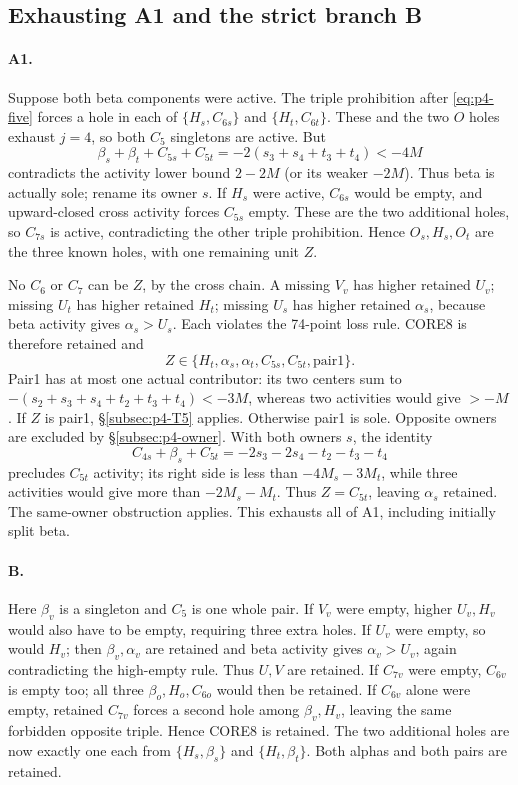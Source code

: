 \documentclass[11pt,letterpaper]{article}
\theoremstyle{definition}\newtheorem{definition}[theorem]{Definition}
\begin{document}
\subsection{Exhausting A1 and the strict branch B}\label{subsec:p4-A1B}
\paragraph{A1.}
Suppose both beta components were active. The triple prohibition after
\eqref{eq:p4-five} forces a hole in each of
$\{H_s,C_{6s}\}$ and $\{H_t,C_{6t}\}$.
These and the two $O$ holes exhaust $j=4$, so both $C_5$ singletons are
active. But
\[
 \beta_s+\beta_t+C_{5s}+C_{5t}
 =-2(s_3+s_4+t_3+t_4)<-4M
\]
contradicts the activity lower bound $2-2M$ (or its weaker $-2M$).
Thus beta is actually sole; rename its owner $s$.
If $H_s$ were active, $C_{6s}$ would be empty, and upward-closed cross
activity forces $C_{5s}$ empty. These are the two additional holes,
so $C_{7s}$ is active, contradicting the other triple prohibition.
Hence $O_s,H_s,O_t$ are the three known holes, with one remaining unit $Z$.

No $C_6$ or $C_7$ can be $Z$, by the cross chain. A missing $V_v$ has
higher retained $U_v$; missing $U_t$ has higher retained $H_t$; missing
$U_s$ has higher retained $\alpha_s$, because beta activity gives
$\alpha_s>U_s$. Each violates the 74-point loss rule.
CORE8 is therefore retained and
\[
 Z\in\{H_t,\alpha_s,\alpha_t,C_{5s},C_{5t},\mathrm{pair1}\}.
\]
Pair1 has at most one actual contributor: its two centers sum to
$-(s_2+s_3+s_4+t_2+t_3+t_4)<-3M$, whereas two activities would give
$>-M$. If $Z$ is pair1, \S\ref{subsec:p4-T5} applies.
Otherwise pair1 is sole. Opposite owners are excluded by
\S\ref{subsec:p4-owner}. With both owners $s$, the identity
\[
 C_{4s}+\beta_s+C_{5t}=-2s_3-2s_4-t_2-t_3-t_4
\]
precludes $C_{5t}$ activity; its right side is less than $-4M_s-3M_t$,
while three activities would give more than $-2M_s-M_t$.
Thus $Z=C_{5t}$, leaving $\alpha_s$ retained. The same-owner obstruction
applies. This exhausts all of A1, including initially split beta.

\paragraph{B.}
Here $\beta_v$ is a singleton and $C_5$ is one whole pair.
If $V_v$ were empty, higher $U_v,H_v$ would also have to be empty,
requiring three extra holes. If $U_v$ were empty, so would $H_v$;
then $\beta_v,\alpha_v$ are retained and beta activity gives
$\alpha_v>U_v$, again contradicting the high-empty rule.
Thus $U,V$ are retained.
If $C_{7v}$ were empty, $C_{6v}$ is empty too; all three
$\beta_o,H_o,C_{6o}$ would then be retained. If $C_{6v}$ alone were
empty, retained $C_{7v}$ forces a second hole among $\beta_v,H_v$,
leaving the same forbidden opposite triple. Hence CORE8 is retained.
The two additional holes are now exactly one each from
$\{H_s,\beta_s\}$ and $\{H_t,\beta_t\}$.
Both alphas and both pairs are retained.
\end{document}

